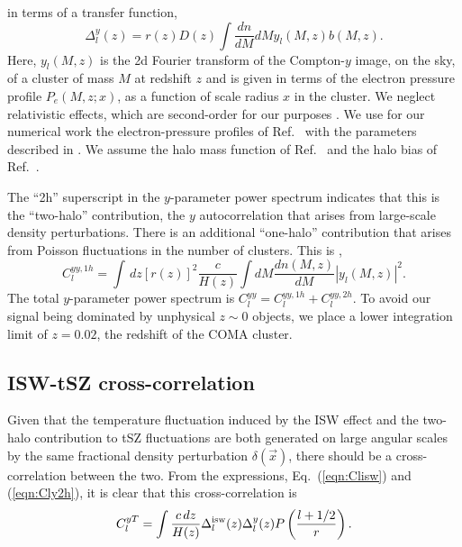 \documentclass[aps,twocolumn,floats,prd,nofootinbib,10pt,floatfix]{revtex4-1}
\begin{document}
in terms of a transfer function,
\begin{equation}
     \Delta_l^{y}(z) = r(z) D(z) \int \frac{dn}{dM}dM 
     y_l(M,z) b(M,z).
\end{equation}
Here, $y_l(M,z)$ is the 2d Fourier transform of the
Compton-$y$ image, on the sky, of a cluster of mass $M$ at
redshift $z$ and is given in terms of the electron pressure
profile $P_e(M,z;x)$, as a function of scale radius $x$ in the
cluster. We neglect relativistic effects, which are second-order 
for our purposes \cite{Itoh:1997ks}.
We use for our numerical work the electron-pressure profiles of
Ref.~\cite{Nagai:2007mt, Arnaud:2009tt} with the parameters 
described in \cite{Dolag:2015dta}. We assume the halo mass 
function of Ref.~\cite{Tinker:2008ff} and the halo bias of
Ref.~\cite{Sheth:1999mn}.

The ``2h'' superscript in the
$y$-parameter power spectrum indicates that this is the
``two-halo'' contribution, the $y$ autocorrelation that arises
from large-scale density perturbations.  There is an additional
``one-halo'' contribution that arises from Poisson fluctuations
in the number of clusters.  This is
\cite{Komatsu:2002wc},
\begin{equation}
     C_l^{yy,1h} = \int\, dz \left[r(z)\right]^2\frac{c}{H(z)}
     \int dM \frac{dn(M,z)}{dM} \left| y_l(M,z)
     \right|^2.
\label{eqn:Cly1h}
\end{equation}
The total $y$-parameter power spectrum is $C_l^{yy} =
C_l^{yy,1h}+C_l^{yy,2h}$.  To avoid our signal being dominated by
unphysical $z\sim 0$ objects, we place a lower integration limit 
of $z=0.02$, the redshift of the COMA cluster.

\subsection{ISW-tSZ cross-correlation}

Given that the temperature fluctuation induced by the ISW effect
and the two-halo contribution to tSZ fluctuations are both
generated on large angular scales by the same fractional density
perturbation $\delta(\vec x)$, there should be a
cross-correlation between the two.  From the expressions,
Eq.~(\ref{eqn:Clisw}) and (\ref{eqn:Cly2h}), it is clear that this
cross-correlation is
\begin{equation}
     C_l^{yT} = \int \frac{c\, dz}{H(z)} \Delta^{\rm isw}_l(z)
     \Delta^y_l(z) P\left(\frac{l+1/2}{r}\right).
\label{eqn:Clcross}
\end{equation}
\end{document}
